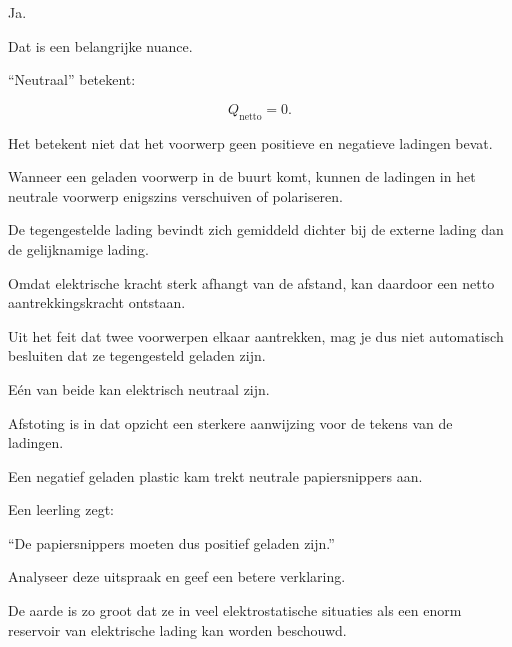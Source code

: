 \documentclass{ximera}
\begin{document}


Ja.

Dat is een belangrijke nuance.

``Neutraal'' betekent:

\[
Q_\mathrm{netto}=0.
\]

Het betekent niet dat het voorwerp geen positieve en negatieve
ladingen bevat.

Wanneer een geladen voorwerp in de buurt komt, kunnen de ladingen in
het neutrale voorwerp enigszins verschuiven of polariseren.

De tegengestelde lading bevindt zich gemiddeld dichter bij de externe
lading dan de gelijknamige lading.

Omdat elektrische kracht sterk afhangt van de afstand, kan daardoor
een netto aantrekkingskracht ontstaan.


\begin{opmerking}

Uit het feit dat twee voorwerpen elkaar aantrekken, mag je dus niet
automatisch besluiten dat ze tegengesteld geladen zijn.

Eén van beide kan elektrisch neutraal zijn.

Afstoting is in dat opzicht een sterkere aanwijzing voor de tekens van
de ladingen.

\end{opmerking}


\begin{oefening}{\oefU\ESS}

Een negatief geladen plastic kam trekt neutrale papiersnippers aan.

Een leerling zegt:

``De papiersnippers moeten dus positief geladen zijn.''

Analyseer deze uitspraak en geef een betere verklaring.

\end{oefening}




De aarde is zo groot dat ze in veel elektrostatische situaties als een
enorm reservoir van elektrische lading kan worden beschouwd.
\end{document}
